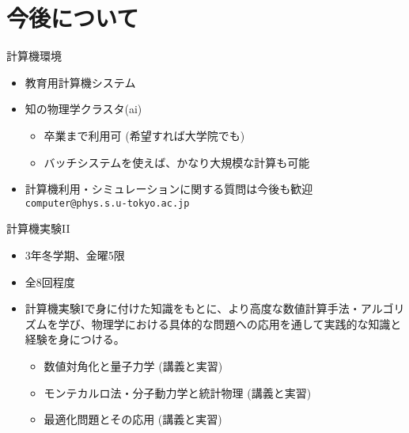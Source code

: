 \documentclass[10pt,dvipdfmx]{beamer}
\begin{document}
\section{今後について}

\begin{frame}[t,fragile]{計算機環境}
  \begin{itemize}
  \item 教育用計算機システム
  \item 知の物理学クラスタ(ai)
    \begin{itemize}
    \item 卒業まで利用可 (希望すれば大学院でも)
    \item バッチシステムを使えば、かなり大規模な計算も可能
    \end{itemize}
  \item 計算機利用・シミュレーションに関する質問は今後も歓迎 {\tt computer@phys.s.u-tokyo.ac.jp}
  \end{itemize}
\end{frame}

\begin{frame}[t,fragile]{計算機実験II}
  \begin{itemize}
  \item 3年冬学期、金曜5限
  \item 全8回程度
  \item 計算機実験Iで身に付けた知識をもとに、より高度な数値計算手法・アルゴリズムを学び、物理学における具体的な問題への応用を通して実践的な知識と経験を身につける。
    \begin{itemize}
      \item 数値対角化と量子力学 (講義と実習)
      \item モンテカルロ法・分子動力学と統計物理 (講義と実習)
      \item 最適化問題とその応用 (講義と実習)
    \end{itemize}
  \end{itemize}
\end{frame}
\end{document}
